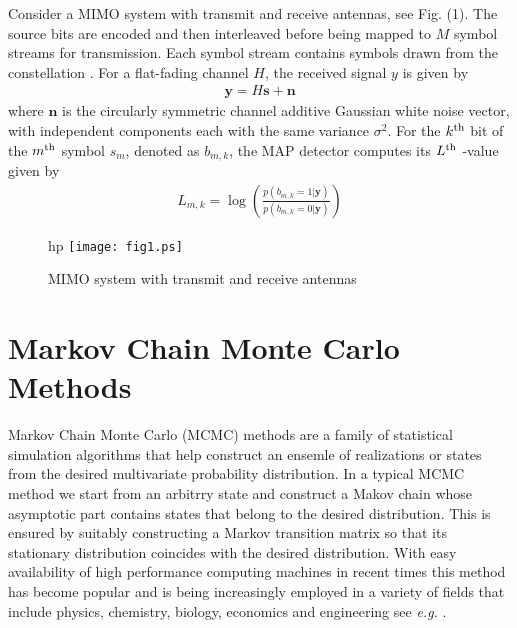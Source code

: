 \documentclass[pre,12pt,aps]{revtex4}
\begin{document}
Consider a MIMO system with transmit and  receive antennas,
see Fig. (1). The source bits are encoded and then interleaved before 
being mapped to $M$ symbol streams for transmission.
Each symbol stream contains symbols drawn from the 
constellation . For a flat-fading channel $H$, 
the received signal $y$ is given by
\begin{eqnarray}
{\mathbf y}=H{\mathbf s} + {\mathbf n}
\end{eqnarray}
where ${\mathbf n}$ is the circularly symmetric channel additive 
 Gaussian white noise vector, with independent components 
each with the same variance $\sigma^2$.
For the $k^{{\rm th}}$ bit of the $m^{{\rm th}}$ symbol $s_m$, 
denoted as $b_{m,k}$, 
the MAP detector computes its $L^{{\rm th}}$ -value given by 
\begin{eqnarray}
L_{m,k}=\log\left( \frac{p(b_{m,k}=1\vert\mathbf{y})}
                        {p(b_{m,k}=0\vert\mathbf{y})}
            \right)
\end{eqnarray}  
\begin{figure}{hp}
\centering
\texttt{[image: fig1.ps]}
\caption{MIMO system with transmit and receive antennas}
\end{figure}
							
\section{Markov Chain Monte Carlo Methods}

Markov Chain Monte Carlo (MCMC) methods are a family of statistical 
simulation algorithms that help construct an ensemle of
realizations or states from the desired multivariate probability 
distribution. In a typical MCMC method we start from an arbitrry
state and construct a Makov chain whose asymptotic part contains
states that belong to the desired distribution. 
This is ensured by suitably constructing a Markov transition
matrix so that its stationary distribution coincides with the 
desired distribution. With easy availability of 
high performance computing
machines in  recent times  this method has  
become popular and is being increasingly employed in a variety
of fields that include physics, chemistry, biology, economics and 
engineering see {\it e.g.} \cite{MC_ref}. 
\end{document}
